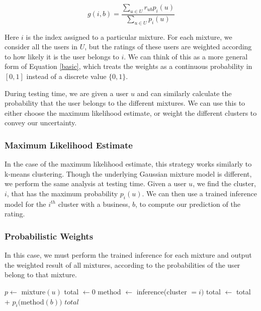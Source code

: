\documentclass[11pt]{article}
\begin{document}
\begin{equation}
\label{weighted}
g(i, b) = \frac{\sum\limits_{u \in U} r_{ub}p_i(u)}{\sum\limits_{u \in U} p_i(u)}
\end{equation}

Here $i$ is the index assigned to a particular mixture. For each mixture, we consider all the users in $U$, but the ratings of these users are weighted according to how likely it is the user belongs to $i$. We can think of this as a more general form of Equation \eqref{basic}, which treats the weights as a continuous probability in $[0, 1]$ instead of a discrete value $\{0, 1\}$.

During testing time, we are given a user $u$ and can similarly calculate the probability that the user belongs to the different mixtures. We can use this to either choose the maximum likelihood estimate, or weight the different clusters to convey our uncertainty.


\subsubsection{Maximum Likelihood Estimate}
In the case of the maximum likelihood estimate, this strategy works similarly to k-means clustering. Though the underlying Gaussian mixture model is different, we perform the same analysis at testing time. Given a user $u$, we find the cluster, $i$, that has the maximum probability $p_i(u)$. We can then use a trained inference model for the $i^{th}$ cluster with a business, $b$, to compute our prediction of the rating.

\subsubsection{Probabilistic Weights}
In this case, we must perform the trained inference for each mixture and output the weighted result of all mixtures, according to the probabilities of the user belong to that mixture.\\

\begin{algorithmic}[1]
	\State $p \gets$ mixture$(u)$ 
	\State total $\gets 0$
	 
	\State method $\gets$ inference(cluster $=i)$ 
	\State total $\gets$ total + $p_i($method$(b))$
	\EndFor
	\State \Return $total$
	\EndFunction
\end{algorithmic}
\medskip
\end{document}
